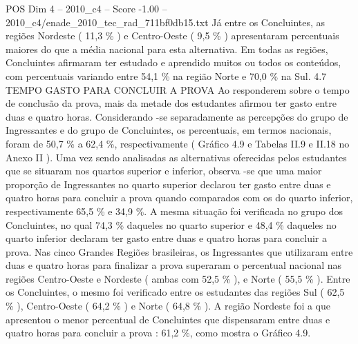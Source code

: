 \begin{textsample}{POS Dim 4 – 2010\_c4 – Score -1.00 – 2010\_c4/enade\_2010\_tec\_rad\_711bf0db15.txt}
Já entre os Concluintes, as regiões Nordeste ( 11,3 \% ) e Centro-Oeste ( 9,5 \% ) apresentaram percentuais maiores do que a média nacional para esta alternativa.
Em todas as regiões, Concluintes afirmaram ter estudado e aprendido muitos ou todos os conteúdos, com percentuais variando entre 54,1 \% na região Norte e 70,0 \% na Sul. 4.7 TEMPO GASTO PARA CONCLUIR A PROVA Ao responderem sobre o tempo de conclusão da prova, mais da metade dos estudantes afirmou ter gasto entre duas e quatro horas.
Considerando -se separadamente as percepções do grupo de Ingressantes e do grupo de Concluintes, os percentuais, em termos nacionais, foram de 50,7 \% a 62,4 \%, respectivamente ( Gráfico 4.9 e Tabelas II.9 e II.18 no Anexo II ).
Uma vez sendo analisadas as alternativas oferecidas pelos estudantes que se situaram nos quartos superior e inferior, observa -se que uma maior proporção de Ingressantes no quarto superior declarou ter gasto entre duas e quatro horas para concluir a prova quando comparados com os do quarto inferior, respectivamente 65,5 \% e 34,9 \%.
A mesma situação foi verificada no grupo dos Concluintes, no qual 74,3 \% daqueles no quarto superior e 48,4 \% daqueles no quarto inferior declaram ter gasto entre duas e quatro horas para concluir a prova.
Nas cinco Grandes Regiões brasileiras, os Ingressantes que utilizaram entre duas e quatro horas para finalizar a prova superaram o percentual nacional nas regiões Centro-Oeste e Nordeste ( ambas com 52,5 \% ), e Norte ( 55,5 \% ).
Entre os Concluintes, o mesmo foi verificado entre os estudantes das regiões Sul ( 62,5 \% ), Centro-Oeste ( 64,2 \% ) e Norte ( 64,8 \% ).
A região Nordeste foi a que apresentou o menor percentual de Concluintes que dispensaram entre duas e quatro horas para concluir a prova : 61,2 \%, como mostra o Gráfico 4.9.

\end{textsample}
